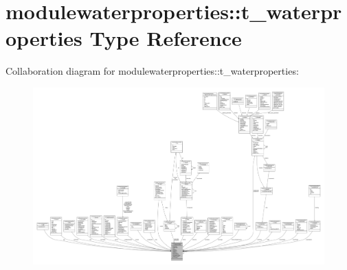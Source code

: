 \hypertarget{structmodulewaterproperties_1_1t__waterproperties}{}\section{modulewaterproperties\+:\+:t\+\_\+waterproperties Type Reference}
\label{structmodulewaterproperties_1_1t__waterproperties}


Collaboration diagram for modulewaterproperties\+:\+:t\+\_\+waterproperties\+:\nopagebreak
\begin{figure}[H]
\begin{center}
\leavevmode
\includegraphics[width=350pt]{structmodulewaterproperties_1_1t__waterproperties__coll__graph}
\end{center}
\end{figure}
